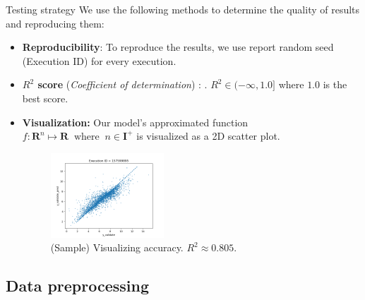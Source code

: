 \documentclass{beamer}
\begin{document}
\begin{frame}[t]{Testing strategy}
We use the following methods to determine the quality of results and reproducing them:
\begin{itemize}
\item \textbf{Reproducibility}: To reproduce the results, we use report random seed (Execution ID) for every execution. 
\item \textbf{$R^2$ score} (\textit{Coefficient of determination}) \cite{r_squared_score}: . $R^2  \in (- \infty, 1.0]$ where $1.0$ is the best score. 
\item \textbf{Visualization:}
Our model's approximated function $ f : \mathbf{R}^n \mapsto \mathbf{R} \;\; \textrm{where} \;\; n \in \mathbf{I}^+$ is visualized as a 2D scatter plot.

\begin{figure}[htb]
  \centering
    \includegraphics[width=0.40\textwidth]{images/accuracy_validate}
    \caption{(Sample) Visualizing accuracy.  $R^2 \approx 0.805$.}
    \label{fig:modelQualityVisualization}
\end{figure}

\end{itemize} 
\end{frame}

\subsection{Data preprocessing}
\end{document}
